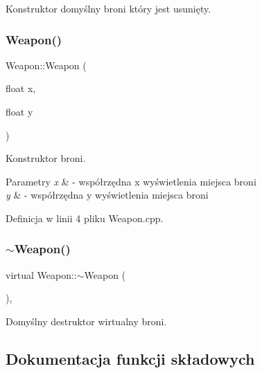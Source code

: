 Konstruktor domyślny broni który jest usunięty. 

\mbox{\label{class_weapon_a0640cf23068ebf732ce564329e5c40f4}} 
\subsubsection{\texorpdfstring{Weapon()}{Weapon()}\hspace{0.1cm}{\footnotesize\ttfamily [2/2]}}
{\footnotesize\ttfamily Weapon\+::\+Weapon (\begin{DoxyParamCaption}\item[{float}]{x,  }\item[{float}]{y }\end{DoxyParamCaption})}



Konstruktor broni. 


\begin{DoxyParams}{Parametry}
{\em x} & -\/ współrzędna x wyświetlenia miejsca broni \\
\hline
{\em y} & -\/ współrzędna y wyświetlenia miejsca broni \\
\hline
\end{DoxyParams}


Definicja w linii 4 pliku Weapon.\+cpp.

\mbox{\label{class_weapon_af06462587d8fd8878be4af2a2479f9bb}} 
\subsubsection{\texorpdfstring{$\sim$\+Weapon()}{~Weapon()}}
{\footnotesize\ttfamily virtual Weapon\+::$\sim$\+Weapon (\begin{DoxyParamCaption}{ }\end{DoxyParamCaption})\hspace{0.3cm}{\ttfamily [virtual]}, {\ttfamily [default]}}



Domyślny destruktor wirtualny broni. 



\subsection{Dokumentacja funkcji składowych}
\mbox{\label{class_weapon_ae0cdebb7e5fde5a913a390ff573001e2}} 
